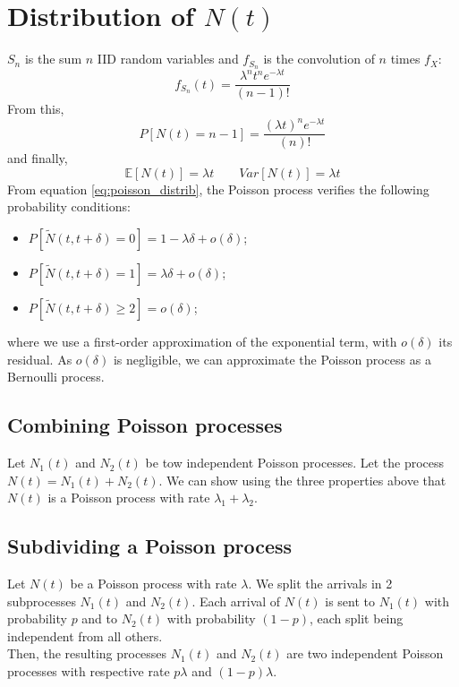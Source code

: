 \documentclass[12pt, openany]{report}
\newcommand{\E}{\mathbb{E}}
\theoremstyle{definition}
\begin{document}
\section{\texorpdfstring{Distribution of $N(t)$}{Distribution of }}
$S_n$ is the sum $n$ IID random variables and $f_{S_n}$ is the convolution of $n$ times $f_X$:
\begin{equation}
  f_{S_n}(t) = \frac{\lambda^n t^{n}e^{-\lambda t}}{(n-1)!}
\end{equation}
From this, 
\begin{equation}\label{eq:poisson_distrib}
  P[N(t)=n-1] = \frac{(\lambda t)^{n}e^{-\lambda t}}{(n)!}
\end{equation}
and finally, 
\begin{equation}
  \E[N(t)] = \lambda t\qquad Var[N(t)] = \lambda t
\end{equation}
From equation \eqref{eq:poisson_distrib}, the Poisson process verifies the following probability conditions:
\begin{itemize}
  \item $P[\tilde N(t,t+\delta)=0]=1-\lambda \delta +o(\delta)$;
  \item $P[\tilde N(t,t+\delta)=1]=\lambda \delta +o(\delta)$;
  \item $P[\tilde N(t,t+\delta)\ge2]=o(\delta)$;
\end{itemize}
where we use a first-order approximation of the exponential term, with $o(\delta)$ its residual. As $o(\delta)$ is negligible, we can approximate the Poisson process as a Bernoulli process. 
\subsection{Combining Poisson processes}
Let $N_1(t)$ and $N_2(t)$ be tow independent Poisson processes. Let the process $N(t)=N_1(t)+N_2(t)$. We can show using the three properties above that $N(t)$ is a Poisson process with rate $\lambda_1+\lambda_2$.
\subsection{Subdividing a Poisson process}
Let $N(t)$ be a Poisson process with rate $\lambda$. We split the arrivals in 2 subprocesses $N_1(t)$ and $N_2(t)$. Each arrival of $N(t)$ is sent to $N_1(t)$ with probability $p$ and to $N_2(t)$ with probability $(1-p)$, each split being independent from all others. \\
Then, the resulting processes $N_1(t)$ and $N_2(t)$ are two independent Poisson processes with respective rate $p\lambda$ and $(1-p)\lambda$.
\end{document}
